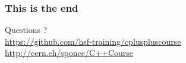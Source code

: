 \documentclass[compress]{beamer}
\begin{document}

\begin{frame}
  \frametitle{This is the end}
  \begin{center}
    \Huge Questions ?\\
    \vspace{.5cm}
    \tiny \href{https://github.com/hsf-training/cpluspluscourse}{https://github.com/hsf-training/cpluspluscourse}\\
    \tiny \href{http://cern.ch/sponce/C++Course}{http://cern.ch/sponce/C++Course}
  \end{center}
\end{frame}
\end{document}
